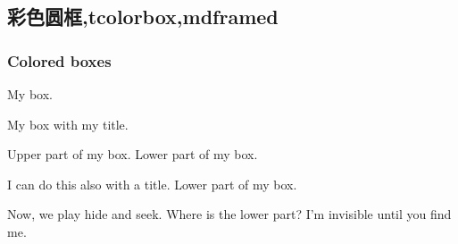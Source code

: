 %
%



\subsection{彩色圆框,tcolorbox,mdframed}

\subsubsection{Colored boxes}

\begin{tcolorbox}[colback=red!5,colframe=red!75!black]
  My box.
\end{tcolorbox}

\begin{tcolorbox}[skin=bicolor,colback=blue!5,colframe=blue!75!black,title=My title]
  My box with my title.
\end{tcolorbox}

\begin{tcolorbox}[colback=green!5,colframe=green!75!black]
  Upper part of my box.
  \tcblower
  Lower part of my box.
\end{tcolorbox}

\begin{tcolorbox}[skin=bicolor,colback=yellow!5,colframe=yellow!75!black,title=My title]
  I can do this also with a title.
  \tcblower
  Lower part of my box.
\end{tcolorbox}

\begin{tcolorbox}[colback=yellow!10,colframe=red!75!black,lowerbox=invisible,
  savelowerto=\jobname_ex.tex]
  Now, we play hide and seek. Where is the lower part?
  \tcblower
  I'm invisible until you find me.
\end{tcolorbox}

